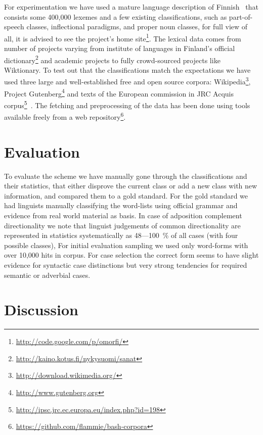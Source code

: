 \documentclass[a5paper]{article}
\begin{document}
For experimentation we have used a mature language description of
Finn\-ish~\cite{pirinen2008suomen} that consists some 400,000 lexemes and a few
existing classifications, such as part-of-speech classes, inflectional
paradigms, and proper noun classes, for full view of all, it is advised to see
the project's home site\footnote{\url{http://code.google.com/p/omorfi/}}. The
lexical data comes from number of projects varying from institute of languages
in Finland's official
dictionary\footnote{\url{http://kaino.kotus.fi/nykysuomi/sanat}} and academic
projects to fully crowd-sourced projects like Wiktionary. To test out that the
classifications match the expectations we have used three large and
well-established free and open source corpora:
Wikipedia\footnote{\url{http://download.wikimedia.org/}}, Project
Gutenberg\footnote{\url{http://www.gutenberg.org}} and texts of the European
commission in JRC Acquis
corpus\footnote{\url{http://ipsc.jrc.ec.europa.eu/index.php?id=198}}~\cite{steinberger2006jrc}.
The fetching and preprocessing of the data has been done using tools available
freely from a web
repository\footnote{\url{https://github.com/flammie/bash-corpora}}.

\section{Evaluation}

To evaluate the scheme we have manually gone through the classifications and
their statistics, that either disprove the current class or add a new class
with new information, and compared them to a gold standard. For the gold
standard we had linguists manually classifying the word-lists using official
grammar and evidence from real world material as basis. In case of adposition
complement directionality we note that linguist judgements of common
directionality are represented in statistics systematically as 48---100~\% of
all cases (with four possible classes), For initial evaluation sampling we used
only word-forms with over 10,000 hits in corpus. For case selection the correct
form seems to have slight evidence for syntactic case distinctions but very
strong tendencies for required semantic or adverbial cases.


\section{Discussion}
\end{document}
